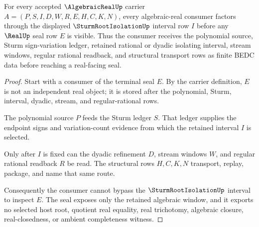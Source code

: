 \begin{theorem}
\label{thm:algebraic-real-isolating-interval-consumer}
For every accepted $\AlgebraicRealUp$ carrier $A=(P,S,I,D,W,R,E,H,C,K,N)$, every algebraic-real consumer factors through the displayed $\SturmRootIsolationUp$ interval row $I$ before any $\RealUp$ seal row $E$ is visible. Thus the consumer receives the polynomial source, Sturm sign-variation ledger, retained rational or dyadic isolating interval, stream windows, regular rational readback, and structural transport rows as finite BEDC data before reaching a real-facing seal.
\end{theorem}
\begin{proof}
Start with a consumer of the terminal seal $E$. By the carrier definition, $E$ is not an independent real object; it is stored after the polynomial, Sturm, interval, dyadic, stream, and regular-rational rows.

The polynomial source $P$ feeds the Sturm ledger $S$. That ledger supplies the endpoint signs and variation-count evidence from which the retained interval $I$ is selected.

Only after $I$ is fixed can the dyadic refinement $D$, stream windows $W$, and regular rational readback $R$ be read. The structural rows $H,C,K,N$ transport, replay, package, and name that same route.

Consequently the consumer cannot bypass the $\SturmRootIsolationUp$ interval to inspect $E$. The seal exposes only the retained algebraic window, and it exports no selected host root, quotient real equality, real trichotomy, algebraic closure, real-closedness, or ambient completeness witness.
\end{proof}


\begin{closurestatus}{\AlgebraicRealUp}
  \theoryclosure{\seedClosure}
  \formalstatus{\unformalizedV}
\end{closurestatus}
